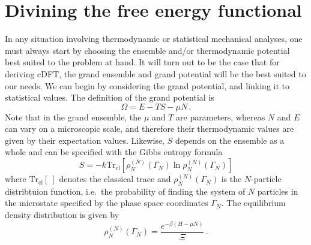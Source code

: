\documentclass{report}
\newcommand{\trace}{\operatorname{Tr_{cl}}}
\begin{document}
\section{Divining the free energy functional}
In any situation involving thermodynamic or statistical mechanical analyses, one must always start by choosing the ensemble and/or thermodynamic potential best suited to the problem at hand. It will turn out to be the case that for deriving cDFT, the grand ensemble and grand potential will be the best suited to our needs. We can begin by considering the grand potential, and linking it to statistical values. The definition of the grand potential is
\begin{equation}
    \Omega = E - TS - \mu N \,.
    \label{eq:grand_potential}
\end{equation}
Note that in the grand ensemble, the \(\mu \) and \(T\) are parameters, whereas \(N\) and \(E\) can vary on a microscopic scale, and therefore their thermodynamic values are given by their expectation values. Likewise, \(S\) depends on the ensemble as a whole and can be specified with the Gibbs entropy formula
\begin{equation}
    S = -k \trace\left[\rho_N^{(N)}(\Gamma_N)\ln\rho_N^{(N)}(\Gamma_N)\right]
    \label{eq:GibbsEntropy}
\end{equation}
where \(\trace[~]\) denotes the classical trace and \(\rho_N^{(N)}(\Gamma_N)\) is the \(N\)-particle distribtuion function, i.e.\ the probability of finding the system of \(N\) particles in the microstate specified by the phase space coordinates \(\Gamma_N\). The equilibrium density distribution is given by
\begin{equation}
    \rho_N^{(N)}(\Gamma_N) = \frac{e^{-\beta(H-\mu N)}}{\Xi} \, .
    \label{eq:rho}
\end{equation}
\end{document}

